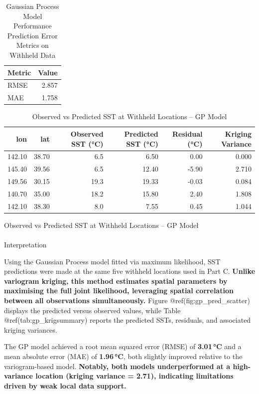 \documentclass[
  11pt,
]{article}
\makeatletter
\let\oldparagraph\paragraph
\renewcommand{\paragraph}{
    \@ifstar
      \xxxParagraphStar
      \xxxParagraphNoStar
  }
\newcommand{\xxxParagraphStar}[1]{\oldparagraph*{#1}\mbox{}}
\newcommand{\xxxParagraphNoStar}[1]{\oldparagraph{#1}\mbox{}}
\makeatother
\begin{document}
\begin{table}
\caption*{
{\large Gaussian Process Model Performance} \\ 
{\small Prediction Error Metrics on Withheld Data}
} 
\begin{tabular*}{\linewidth}{@{\extracolsep{\fill}}lr}
\toprule
Metric & Value \\ 
\midrule\addlinespace[2.5pt]
RMSE & 2.857 \\ 
MAE & 1.758 \\ 
\bottomrule
\end{tabular*}
\end{table}

\begin{table}

\caption{Observed vs Predicted SST at Withheld Locations – GP Model}
\centering
\begin{tabular}[t]{rrrrrr}
\toprule
lon & lat & Observed SST (°C) & Predicted SST (°C) & Residual (°C) & Kriging Variance\\
\midrule
142.10 & 38.70 & 6.5 & 6.50 & 0.00 & 0.000\\
145.40 & 39.56 & 6.5 & 12.40 & -5.90 & 2.710\\
149.56 & 30.15 & 19.3 & 19.33 & -0.03 & 0.084\\
140.70 & 35.00 & 18.2 & 15.80 & 2.40 & 1.808\\
142.10 & 38.30 & 8.0 & 7.55 & 0.45 & 1.044\\
\bottomrule
\end{tabular}
\end{table}

Observed vs Predicted SST at Withheld Locations -- GP Model

\paragraph{Interpretation}\label{interpretation}

Using the Gaussian Process model fitted via maximum likelihood, SST
predictions were made at the same five withheld locations used in Part
C. \textbf{Unlike variogram kriging, this method estimates spatial
parameters by maximising the full joint likelihood, leveraging spatial
correlation between all observations simultaneously.} Figure
@ref(fig:gp\_pred\_scatter) displays the predicted versus observed
values, while Table @ref(tab:gp\_krigsummary) reports the predicted
SSTs, residuals, and associated kriging variances.

The GP model achieved a root mean squared error (RMSE) of
\textbf{3.01\,°C} and a mean absolute error (MAE) of \textbf{1.96\,°C},
both slightly improved relative to the variogram-based model.
\textbf{Notably, both models underperformed at a high-variance location
(kriging variance = 2.71), indicating limitations driven by weak local
data support.}
\end{document}
